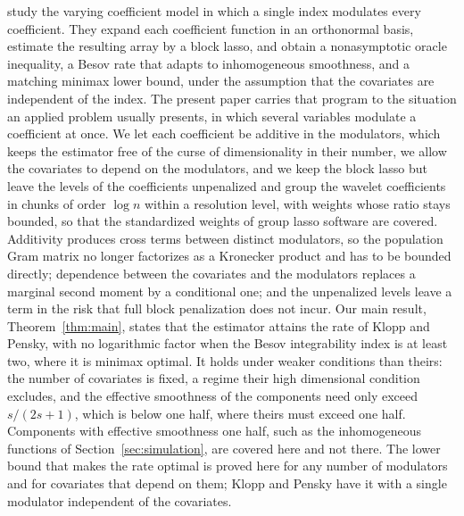 \citet{Klopp-Pensky-2015} study the varying coefficient model in which a
single index modulates every coefficient. They expand each coefficient
function in an orthonormal basis, estimate the resulting array by a block
lasso, and obtain a nonasymptotic oracle inequality, a Besov rate that adapts
to inhomogeneous smoothness, and a matching minimax lower bound, under the
assumption that the covariates are independent of the index. The present paper
carries that  program to the situation an applied problem usually presents,
in which several variables modulate a coefficient at once. We let each
coefficient be additive in the modulators, which keeps the estimator free of
the curse of dimensionality in their number, we allow the covariates to depend
on the modulators, and we  keep the block lasso but leave the levels of the
coefficients unpenalized and group the wavelet coefficients in chunks of order
$\log n$ within a resolution level, with weights whose ratio stays bounded, so
that the standardized weights of group lasso software are covered.
Additivity produces cross terms between distinct modulators,
so the population Gram matrix no longer factorizes as a Kronecker product and
has to be bounded directly; dependence between the covariates and the
modulators replaces a marginal second moment by a conditional one; and the
unpenalized levels leave a term in the risk that full block penalization does not
incur. Our main result, Theorem~\ref{thm:main}, states that the estimator
attains the rate of  
Klopp and Pensky, with no logarithmic factor when the Besov integrability
index is at least two, 
where it is minimax optimal. It holds under weaker conditions than
theirs: the number of covariates is fixed, a regime their high dimensional
condition excludes, and the effective smoothness of the components need only
exceed $s/(2s+1)$, which is below one half, where theirs must exceed one half.
Components with effective smoothness one half, such as the inhomogeneous
functions of Section~\ref{sec:simulation}, are covered here and not there. 
The lower bound that makes  the rate optimal is proved here for any number of
modulators and for covariates that depend on them; Klopp and Pensky have it
with a single modulator independent of the covariates.

